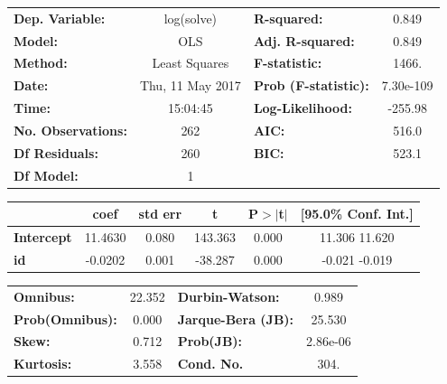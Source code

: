 \documentclass{article}
\begin{document}
\begin{center}
\begin{tabular}{lclc}
\toprule
\textbf{Dep. Variable:}    &    log(solve)    & \textbf{  R-squared:         } &     0.849   \\
\textbf{Model:}            &       OLS        & \textbf{  Adj. R-squared:    } &     0.849   \\
\textbf{Method:}           &  Least Squares   & \textbf{  F-statistic:       } &     1466.   \\
\textbf{Date:}             & Thu, 11 May 2017 & \textbf{  Prob (F-statistic):} & 7.30e-109   \\
\textbf{Time:}             &     15:04:45     & \textbf{  Log-Likelihood:    } &   -255.98   \\
\textbf{No. Observations:} &         262      & \textbf{  AIC:               } &     516.0   \\
\textbf{Df Residuals:}     &         260      & \textbf{  BIC:               } &     523.1   \\
\textbf{Df Model:}         &           1      & \textbf{                     } &             \\
\bottomrule
\end{tabular}
\begin{tabular}{lccccc}
                   & \textbf{coef} & \textbf{std err} & \textbf{t} & \textbf{P$>$$|$t$|$} & \textbf{[95.0\% Conf. Int.]}  \\
\midrule
\textbf{Intercept} &      11.4630  &        0.080     &   143.363  &         0.000        &        11.306    11.620       \\
\textbf{id}        &      -0.0202  &        0.001     &   -38.287  &         0.000        &        -0.021    -0.019       \\
\bottomrule
\end{tabular}
\begin{tabular}{lclc}
\textbf{Omnibus:}       & 22.352 & \textbf{  Durbin-Watson:     } &    0.989  \\
\textbf{Prob(Omnibus):} &  0.000 & \textbf{  Jarque-Bera (JB):  } &   25.530  \\
\textbf{Skew:}          &  0.712 & \textbf{  Prob(JB):          } & 2.86e-06  \\
\textbf{Kurtosis:}      &  3.558 & \textbf{  Cond. No.          } &     304.  \\
\bottomrule
\end{tabular}
\end{center}
\end{document}
